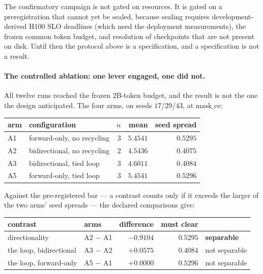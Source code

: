 \documentclass[11pt]{article}
\begin{document}
The confirmatory campaign is not gated on resources. It is gated on a preregistration
that cannot yet be sealed, because sealing requires development-derived H100 SLO
deadlines (which need the deployment measurements), the frozen common token budget, and
resolution of checkpoints that are not present on disk. Until then the protocol above is
a specification, and a specification is not a result.

\paragraph{The controlled ablation: one lever engaged, one did not.} All twelve runs
reached the frozen $2$B-token budget, and the result is not the one the design anticipated.
The four arms, on seeds $17$/$29$/$43$, at $\mathrm{mask\_ce}$:

\begin{center}
\begin{tabular}{llrrr}
\toprule
arm & configuration & $n$ & mean & seed spread \\
\midrule
A1 & forward-only, no recycling & $3$ & $5.4541$ & $0.5295$ \\
A2 & bidirectional, no recycling & $2$ & $4.5436$ & $0.4075$ \\
A3 & bidirectional, tied loop & $3$ & $4.6011$ & $0.4084$ \\
A5 & forward-only, tied loop & $3$ & $5.4541$ & $0.5296$ \\
\bottomrule
\end{tabular}
\end{center}

Against the pre-registered bar --- a contrast counts only if it exceeds the larger of the two
arms' seed spreads --- the declared comparisons give:

\begin{center}
\begin{tabular}{llrrl}
\toprule
contrast & arms & difference & must clear & \\
\midrule
directionality & A2 $-$ A1 & $-0.9104$ & $0.5295$ & \textbf{separable} \\
the loop, bidirectional & A3 $-$ A2 & $+0.0575$ & $0.4084$ & not separable \\
the loop, forward-only & A5 $-$ A1 & $+0.0000$ & $0.5296$ & not separable \\
\bottomrule
\end{tabular}
\end{center}
\end{document}
